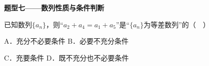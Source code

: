 \documentclass[12pt,a4paper]{article}
\newcommand{\qtitle}[1]{{\Large\bfseries\color[HTML]{1F3864}#1}\par\vspace{0.9em}}
\begin{document}
\qtitle{题型七——数列性质与条件判断}

已知数列$\{a_n\}$，则“$a_2+a_4=a_1+a_5$”是“$\{a_n\}$为等差数列”的（　）\par
\vspace{0.9em}
A．充分不必要条件 \qquad\qquad B．必要不充分条件\par
\vspace{0.45em}
C．充要条件 \qquad\qquad D．既不充分也不必要条件\par
\vspace{0.45em}
\end{document}
